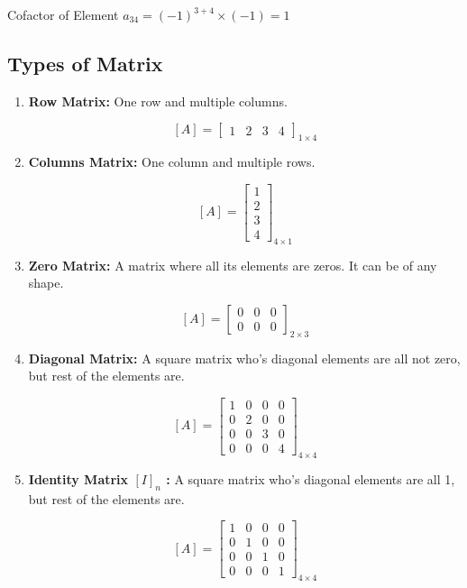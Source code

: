 Cofactor of Element $a_{34} = (-1)^{3+4} \times (-1) = 1$

\subsection{Types of Matrix}

\begin{enumerate}
    \item \textbf{Row Matrix:} One row and multiple columns.

    $$  [A] = \begin{bmatrix}
        1 & 2 & 3 & 4
        \end{bmatrix}_{1 \times 4}
    $$

    \item \textbf{Columns Matrix:} One column and multiple rows.

    $$  [A] = \begin{bmatrix}
        1 \\ 2 \\ 3 \\ 4
        \end{bmatrix}_{4 \times 1}
    $$

    \item \textbf{Zero Matrix:} A matrix where all its elements are zeros. It can be of any shape.

    $$  [A] = \begin{bmatrix}
        0 & 0 & 0 \\
        0 & 0 & 0
        \end{bmatrix}_{2 \times 3}
    $$

    \item \textbf{Diagonal Matrix:} A square matrix who's diagonal elements are all not zero, but rest of the elements are.

    $$  [A] = \begin{bmatrix}
        1 & 0 & 0 & 0 \\
        0 & 2 & 0 & 0 \\
        0 & 0 & 3 & 0 \\
        0 & 0 & 0 & 4
        \end{bmatrix}_{4 \times 4}
    $$

    \item \textbf{Identity Matrix $[I]_n$ :} A square matrix who's diagonal elements are all 1, but rest of the elements are.

    $$  [A] = \begin{bmatrix}
        1 & 0 & 0 & 0 \\
        0 & 1 & 0 & 0 \\
        0 & 0 & 1 & 0 \\
        0 & 0 & 0 & 1
        \end{bmatrix}_{4 \times 4}
    $$


\end{enumerate}
